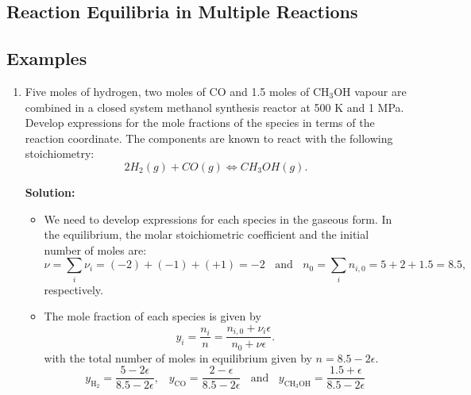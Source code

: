 \documentclass[12pts,a4paper,amsmath,amssymb,floatfix]{article}%
\newcommand{\frc}{\displaystyle\frac}
\newcounter{reaction}
\begin{document}
\subsection{Reaction Equilibria in Multiple Reactions}\label{Section:06:MultipleReactions}

\subsection{}\label{Section:06:}

\clearpage

\subsection{Examples}

\begin{enumerate}[1)]

\item\label{Example:1} Five moles of hydrogen, two moles of CO and 1.5 moles of CH$_{3}$OH vapour are combined in a closed system methanol synthesis reactor at 500 K and 1 MPa. Develop expressions for the mole fractions of the species in terms of the reaction coordinate. The components are known to react with the following stoichiometry:
  \begin{displaymath}
      2 H_{2} (g) + CO (g) \Longleftrightarrow CH_{3}OH (g).
  \end{displaymath}

\bigskip

{\large{\bf Solution:}}

   \begin{itemize}
      \item We need to develop expressions for each species in the gaseous form. In the equilibrium, the molar stoichiometric coefficient and the initial number of moles are:
         \begin{displaymath}
            \nu = \sum\limits_{i}\nu_{i}= (-2)+(-1)+(+1)= -2 \;\;\text{ and }\;\; n_{0} = \sum\limits_{i}n_{i,0}= 5 + 2 + 1.5 = 8.5,
         \end{displaymath} 
         respectively.
      \item The mole fraction of each species is given by
         \begin{displaymath}
           y_{i} = \frc{n_{i}}{n} = \frc{n_{i,0}+\nu_{i}\epsilon}{n_{0}+\nu\epsilon}.
         \end{displaymath}
         with the total number of moles in equilibrium given by $n=8.5-2\epsilon$.
         \begin{displaymath}
           y_{\text{H}_{2}} = \frc{5-2\epsilon}{8.5-2\epsilon},\;\;\; y_{\text{CO}} = \frc{2-\epsilon}{8.5-2\epsilon}\;\;\text{ and }\;\; y_{\text{CH}_{3}\text{OH}}=\frc{1.5+\epsilon}{8.5-2\epsilon}
         \end{displaymath}
   \end{itemize}
\clearpage


\end{enumerate}
\end{document}
